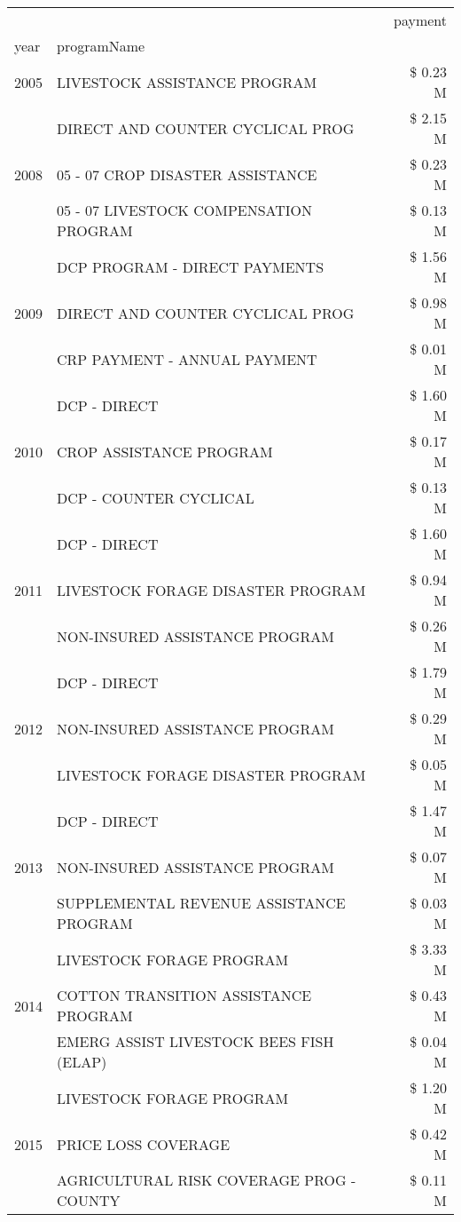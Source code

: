 \begin{tabular}{llr}
\toprule
 &  & payment \\
year & programName &  \\
\midrule
2005 & LIVESTOCK ASSISTANCE PROGRAM & \$ 0.23 M \\
\cline{1-3}
\multirow[t]{3}{*}{2008} & DIRECT AND COUNTER CYCLICAL PROG & \$ 2.15 M \\
 & 05 - 07 CROP DISASTER ASSISTANCE & \$ 0.23 M \\
 & 05 - 07 LIVESTOCK COMPENSATION PROGRAM & \$ 0.13 M \\
\cline{1-3}
\multirow[t]{3}{*}{2009} & DCP PROGRAM - DIRECT PAYMENTS & \$ 1.56 M \\
 & DIRECT AND COUNTER CYCLICAL PROG & \$ 0.98 M \\
 & CRP PAYMENT - ANNUAL PAYMENT & \$ 0.01 M \\
\cline{1-3}
\multirow[t]{3}{*}{2010} & DCP - DIRECT & \$ 1.60 M \\
 & CROP ASSISTANCE PROGRAM & \$ 0.17 M \\
 & DCP - COUNTER CYCLICAL & \$ 0.13 M \\
\cline{1-3}
\multirow[t]{3}{*}{2011} & DCP - DIRECT & \$ 1.60 M \\
 & LIVESTOCK FORAGE DISASTER PROGRAM & \$ 0.94 M \\
 & NON-INSURED ASSISTANCE PROGRAM & \$ 0.26 M \\
\cline{1-3}
\multirow[t]{3}{*}{2012} & DCP - DIRECT & \$ 1.79 M \\
 & NON-INSURED ASSISTANCE PROGRAM & \$ 0.29 M \\
 & LIVESTOCK FORAGE DISASTER PROGRAM & \$ 0.05 M \\
\cline{1-3}
\multirow[t]{3}{*}{2013} & DCP - DIRECT & \$ 1.47 M \\
 & NON-INSURED ASSISTANCE PROGRAM & \$ 0.07 M \\
 & SUPPLEMENTAL REVENUE ASSISTANCE PROGRAM & \$ 0.03 M \\
\cline{1-3}
\multirow[t]{3}{*}{2014} & LIVESTOCK FORAGE PROGRAM & \$ 3.33 M \\
 & COTTON TRANSITION ASSISTANCE PROGRAM & \$ 0.43 M \\
 & EMERG ASSIST LIVESTOCK BEES FISH (ELAP) & \$ 0.04 M \\
\cline{1-3}
\multirow[t]{3}{*}{2015} & LIVESTOCK FORAGE PROGRAM & \$ 1.20 M \\
 & PRICE LOSS COVERAGE & \$ 0.42 M \\
 & AGRICULTURAL RISK COVERAGE PROG - COUNTY & \$ 0.11 M \\

\end{tabular}
